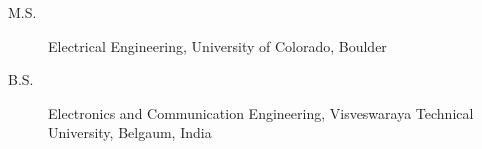 
\begin{description}
\item[M.S.] Electrical Engineering, University of Colorado, Boulder
\item[B.S.] Electronics and Communication Engineering, Visveswaraya Technical University, Belgaum, India
\end{description}


